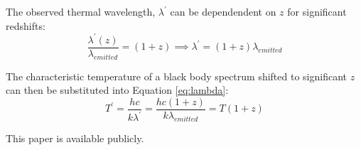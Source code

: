 \documentclass{paper}
\begin{document}
\begin{enumerate}
      The observed thermal wavelength, \(\lambda^\prime\) can be 
      dependendent on \(z\) for significant redshifts:
      \[ \frac{\lambda^\prime(z)}{\lambda_{emitted}} = (1 +z)
      \implies \lambda^\prime = (1 + z)\lambda_{emitted} \]

      The characteristic temperature of a black body spectrum shifted to
      significant \(z\) can then be substituted into Equation \ref{eq:lambda}:
      \[ T^\prime = \frac{h c}{k \lambda^\prime} 
      = \frac{h c (1 + z)}{k \lambda_{emitted}}= T (1 + z)\]

\end{enumerate}

This paper is available publicly.\cite{Hayden_Cosmology_Source_Repo}

\pagebreak
\printbibliography
\end{document}
